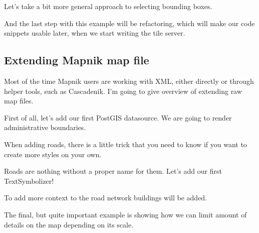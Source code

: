 \documentclass[letterpaper]{article}
\begin{document}
Let's take a bit more general approach to selecting bounding
boxes.

\begin{centering}
    
\end{centering}

And the last step with this example will be refactoring, which
will make our code snippets usable later, when we start writing
the tile server.

\begin{centering}
    
\end{centering}

\subsection{Extending Mapnik map file}
\label{sec:extending-mapnik-map}

Most of the time Mapnik users are working with XML, either directly
or through helper tools, such as Cascadenik. I'm going to give
overview of extending raw map files.

First of all, let's add our first PostGIS datasource. We are going
to render administrative boundaries.

\begin{centering}
    
\end{centering}

When adding roads, there is a little trick that you need to know
if you want to create more styles on your own.

\begin{centering}
    
\end{centering}

Roads are nothing without a proper name for them. Let's add our first
TextSymbolizer!

\begin{centering}
  
\end{centering}

To add more context to the road network buildings will be added.

\begin{centering}
  
\end{centering}

The final, but quite important example is showing how we can limit
amount of details on the map depending on its scale.
\end{document}
